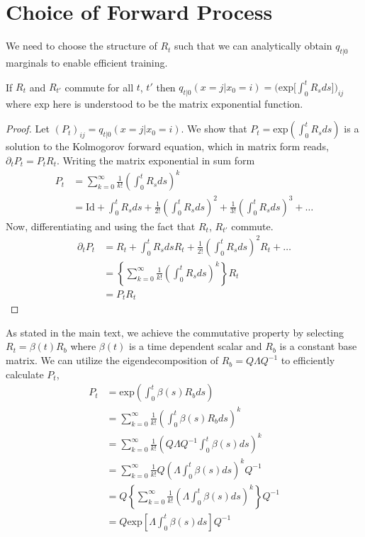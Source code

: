 \documentclass{article}
\begin{document}
\section{Choice of Forward Process} \label{sec:ApdxChoiceOfForwardProcess}
We need to choose the structure of $R_t$ such that we can analytically obtain $q_{t|0}$ marginals to enable efficient training.
\begin{proposition}
If $R_t$ and $R_{t'}$ commute for all $t$, $t'$ then $q_{t|0}(x = j | x_0 = i) = \big( \text{exp} \big[ \int_0^t R_s ds \big] \big)_{ij}$ where $\text{exp}$ here is understood to be the matrix exponential function.
\end{proposition}
\begin{proof}
Let $(P_t)_{ij} = q_{t|0}(x = j | x_0 = i)$. We show that $P_t = \text{exp} \left( \int_0^t R_s ds \right)$ is a solution to the Kolmogorov forward equation, which in matrix form reads, $\partial_t P_t = P_t R_t$. Writing the matrix exponential in sum form
\begin{align}
    P_t &= \sum_{k=0}^\infty \frac{1}{k!} \left( \int_0^t R_s ds \right)^k\\
    &= \mathrm{Id} + \int_0^t R_s ds + \frac{1}{2!} \left( \int_0^t R_s ds \right)^2 + \frac{1}{3!} \left( \int_0^t R_s ds \right)^3 + \dots
\end{align}
Now, differentiating and using the fact that $R_t$, $R_{t'}$ commute.
\begin{align}
    \partial_t P_t &= R_t + \int_0^t R_s ds R_t + \frac{1}{2!} \left( \int_0^t R_s ds \right)^2 R_t + \dots\\
    &= \left\{ \sum_{k=0}^\infty \frac{1}{k!} \left( \int_0^t R_s ds \right)^k \right\} R_t\\
    &= P_t R_t
\end{align}
\end{proof}
As stated in the main text, we achieve the commutative property by selecting $R_t = \beta(t) R_{b}$ where $\beta(t)$ is a time dependent scalar and $R_b$ is a constant base matrix. We can utilize the eigendecomposition of $R_b = Q \Lambda Q^{-1}$ to efficiently calculate $P_t$, 
\begin{align}
    P_t &= \text{exp} \left( \int_0^t \beta(s) R_b ds \right)\\
    &= \sum_{k=0}^\infty \frac{1}{k!} \left( \int_0^t \beta(s) R_b ds \right)^k\\
    &= \sum_{k=0}^\infty \frac{1}{k!} \left(Q \Lambda Q^{-1} \int_0^t \beta(s) ds \right)^k\\
    &= \sum_{k=0}^\infty \frac{1}{k!} Q \left(\Lambda \int_0^t \beta(s) ds \right)^k Q^{-1}\\
    &= Q \left\{ \sum_{k=0}^\infty \frac{1}{k!} \left(\Lambda \int_0^t \beta(s) ds \right)^k \right\} Q^{-1}\\
    &= Q \text{exp} \left[ \Lambda \int_0^t \beta(s) ds \right] Q^{-1}
\end{align}
\end{document}
